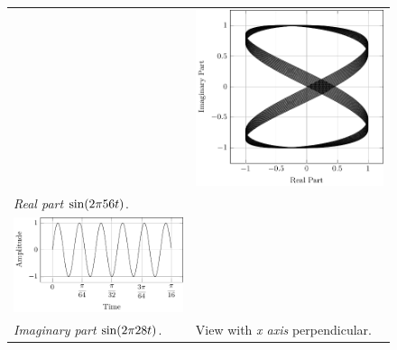 \documentclass[../../course]{subfiles}
\begin{document}
\begin{figure} [H]
\begin{NiceTabularX} {\textwidth} {
            *{2}{>{\centering\arraybackslash}X}
        }
        &

         {
             {
                \includegraphics[height = \textheight] {tikzpics/plotFrontViewComplexG.pdf}
            }
        }

        \\

         {\emph{Real part} $\sin(2 \pi 56 t)$.}
        \label{plt:realCmplxG}

        &
        \\

         {
             {
                \includegraphics[height = \textheight] {tikzpics/plotShortX1.pdf}
            }
        }

        &
        \\

         {\emph{Imaginary part} $\sin(2 \pi 28 t)$.}
        \label{plt:imagCmplxG}

        &

         {View with \emph{x axis} perpendicular.}
        \label{plt:frontViewCmplxG}

        \\

    \end{NiceTabularX}

\end{figure}
\end{document}
